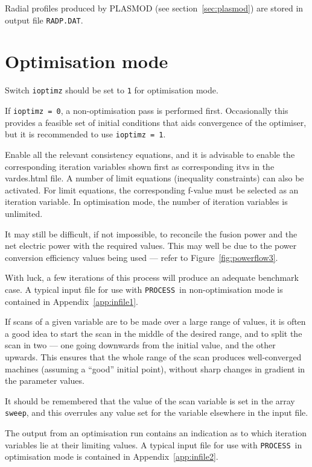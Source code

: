 \documentclass[11pt,a4paper]{report}
\newcommand{\radpdat}{\mbox{\texttt{RADP.DAT}}}
\newcommand{\process}{\mbox{\texttt{PROCESS}}}
\begin{document}
Radial profiles produced by PLASMOD (see section~\ref{sec:plasmod}) are stored in
output file \radpdat. 

\section{Optimisation mode}

Switch \texttt{ioptimz} should be set to \texttt{1} for optimisation mode.

If \texttt{ioptimz = 0}, a non-optimisation pass is performed first.  Occasionally this provides a feasible set of initial conditions that aids convergence of the optimiser, but it is recommended to use \texttt{ioptimz = 1}.

Enable all the relevant consistency equations, and it is advisable to enable the corresponding iteration variables shown first as corresponding itvs in the vardes.html file. A number of limit equations (inequality constraints) can also be activated.  For limit equations, the corresponding f-value must be selected as an iteration variable.  In optimisation mode, the number of iteration variables is unlimited.

It may still be difficult, if not impossible, to reconcile the fusion power
and the net electric power with the required values. This may well be due to
the power conversion efficiency values being used --- refer to
Figure~\ref{fig:powerflow3}.

With luck, a few iterations of this process will produce an adequate benchmark
case. A typical input file for use with \process\ in non-optimisation mode is
contained in Appendix~\ref{app:infile1}.

If scans of a given variable are to be made over a large range of
values, it is often a good idea to start the scan in the middle of the desired
range, and to split the scan in two --- one going downwards from the initial
value, and the other upwards.  This ensures that the whole range of the scan
produces well-converged machines (assuming a ``good'' initial point), without
sharp changes in gradient in the parameter values.

It should be remembered that the value of the scan variable is set in the
array \texttt{sweep}, and this overrules any value set for the variable
elsewhere in the input file.

The output from an optimisation run contains an indication as to which iteration variables lie at their limiting values. A typical input file for use with \process\ in optimisation mode is contained in Appendix~\ref{app:infile2}.
\end{document}
